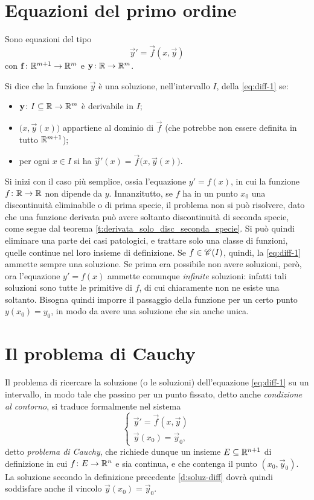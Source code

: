 \section{Equazioni del primo ordine}
Sono equazioni del tipo
\begin{equation} \label{eq:diff-1}
\vec y'=\vec f(x,\vec y)
\end{equation}
con $\mathbf{f}\colon\mathbb{R}^{m+1}\to\mathbb{R}^m$ e $\mathbf{y}\colon\mathbb{R}\to\mathbb{R}^m$.
\begin{definizione} \label{d:soluz-diff}
Si dice che la funzione $\vec y$ è una soluzione, nell'intervallo $I$, della \eqref{eq:diff-1} se:
\begin{itemize}
\item$\mathbf{y}\colon I\subseteq\mathbb{R}\to\mathbb{R}^m$ è derivabile in $I$;
\item$\big(x,\vec y(x)\big)$ appartiene al dominio di $\vec f$ (che potrebbe non essere definita in tutto $\mathbb{R}^{m+1}$);
\item per ogni $x\in I$ si ha $\vec y'(x)=\vec f\big(x,\vec y(x)\big)$.
\end{itemize}
\end{definizione}
Si inizi con il caso più semplice, ossia l'equazione $y'=f(x)$, in cui la funzione $f\colon\mathbb{R}\to\mathbb{R}$ non dipende da $y$. Innanzitutto, se $f$ ha in un punto $x_0$ una discontinuità eliminabile o di prima specie, il problema non si può risolvere, dato che una funzione derivata può avere soltanto discontinuità di seconda specie, come segue dal teorema \ref{t:derivata_solo_disc_seconda_specie}.
Si può quindi eliminare una parte dei casi patologici, e trattare solo una classe di funzioni, quelle continue nel loro insieme di definizione. Se $f\in\mathscr C^{}(I)$, quindi, la \eqref{eq:diff-1} ammette sempre una soluzione. Se prima era possibile non avere soluzioni, però, ora l'equazione $y'=f(x)$ ammette comunque \emph{infinite} soluzioni: infatti tali soluzioni sono tutte le primitive di $f$, di cui chiaramente non ne esiste una soltanto. Bisogna quindi imporre il passaggio della funzione per un certo punto $y(x_0)=y_0$, in modo da avere una soluzione che sia anche unica.

\section{Il problema di Cauchy}
Il problema di ricercare la soluzione (o le soluzioni) dell'equazione \eqref{eq:diff-1} su un intervallo, in modo tale che passino per un punto fissato, detto anche \emph{condizione al contorno}, si traduce formalmente nel sistema
\begin{equation} \label{pc}
\begin{cases}
\vec y'=\vec f(x,\vec y)\\\vec y(x_0)=\vec y_0,
\end{cases}
\end{equation}
detto \emph{problema di Cauchy}, che richiede dunque un insieme $E\subseteq\mathbb{R}^{n+1}$ di definizione in cui $f\colon E\to\mathbb{R}^n$ e sia continua, e che contenga il punto $(x_0,\vec y_0)$. La soluzione secondo la definizione precedente \ref{d:soluz-diff} dovrà quindi soddisfare anche il vincolo $\vec y(x_0)=\vec y_0$.


